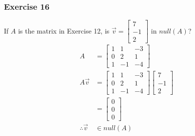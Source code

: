 \documentclass[letterpaper, 12pt]{math}
\begin{document}
\subsubsection*{Exercise 16}
If \( A \) is the matrix in Exercise 12, is \( \vec{v} = \begin{bmatrix}
7 \\ -1 \\ 2\end{bmatrix} \) in \( null(A) \)?
\begin{align*}
  A &= \begin{bmatrix}
    1 & 1 & -3 \\
    0 & 2 & 1 \\
    1 & -1 & -4
  \end{bmatrix} \\
  A\vec{v} &= \begin{bmatrix}
    1 & 1 & -3 \\
    0 & 2 & 1 \\
    1 & -1 & -4
  \end{bmatrix}\begin{bmatrix}7 \\ -1 \\ 2\end{bmatrix} \\
  &= \begin{bmatrix}0 \\ 0 \\ 0\end{bmatrix} \\
  \therefore \vec{v} &\in null(A)
\end{align*}
\end{document}

